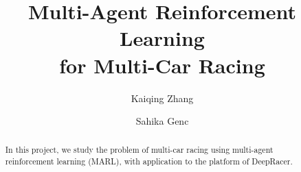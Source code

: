 \documentclass{article}
\author{Kaiqing Zhang \and Sahika Genc}
\begin{document}
\title{Multi-Agent Reinforcement Learning \\for  Multi-Car Racing}


\maketitle   
   
 


\begin{abstract}
In this project, we study the problem of multi-car racing using multi-agent reinforcement learning (MARL), with application  to the platform of DeepRacer. 
\end{abstract}
 


 










% 




%




\newpage




\appendix




 
\end{document}
